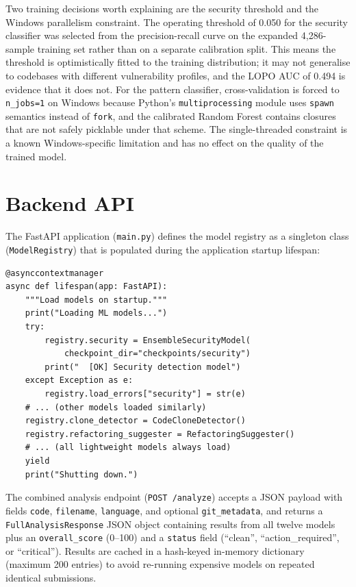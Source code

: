 \documentclass[12pt, oneside]{report}
\begin{document}
Two training decisions worth explaining are the security threshold and the Windows
parallelism constraint. The operating threshold of 0.050 for the security classifier
was selected from the precision-recall curve on the expanded 4,286-sample training set
rather than on a separate calibration split. This means the threshold is optimistically
fitted to the training distribution; it may not generalise to codebases with different
vulnerability profiles, and the LOPO AUC of 0.494 is evidence that it does not. For
the pattern classifier, cross-validation is forced to \texttt{n\_jobs=1} on Windows
because Python's \texttt{multiprocessing} module uses \texttt{spawn} semantics instead
of \texttt{fork}, and the calibrated Random Forest contains closures that are not safely
picklable under that scheme. The single-threaded constraint is a known Windows-specific
limitation and has no effect on the quality of the trained model.


\section{Backend API}
\label{sec:api}

The FastAPI application (\texttt{main.py}) defines the model registry as a singleton
class (\texttt{ModelRegistry}) that is populated during the application startup lifespan:

\begin{lstlisting}[caption={FastAPI lifespan: loading ML models at startup},
                   label={lst:lifespan}, style=pythonstyle]
@asynccontextmanager
async def lifespan(app: FastAPI):
    """Load models on startup."""
    print("Loading ML models...")
    try:
        registry.security = EnsembleSecurityModel(
            checkpoint_dir="checkpoints/security")
        print("  [OK] Security detection model")
    except Exception as e:
        registry.load_errors["security"] = str(e)
    # ... (other models loaded similarly)
    registry.clone_detector = CodeCloneDetector()
    registry.refactoring_suggester = RefactoringSuggester()
    # ... (all lightweight models always load)
    yield
    print("Shutting down.")
\end{lstlisting}

The combined analysis endpoint (\texttt{POST /analyze}) accepts a JSON payload with fields
\texttt{code}, \texttt{filename}, \texttt{language}, and optional \texttt{git\_metadata},
and returns a \texttt{FullAnalysisResponse} JSON object containing results from all twelve
models plus an \texttt{overall\_score} (0--100) and a \texttt{status} field (``clean'',
``action\_required'', or ``critical''). Results are cached in a hash-keyed in-memory
dictionary (maximum 200 entries) to avoid re-running expensive models on repeated
identical submissions.
\end{document}

